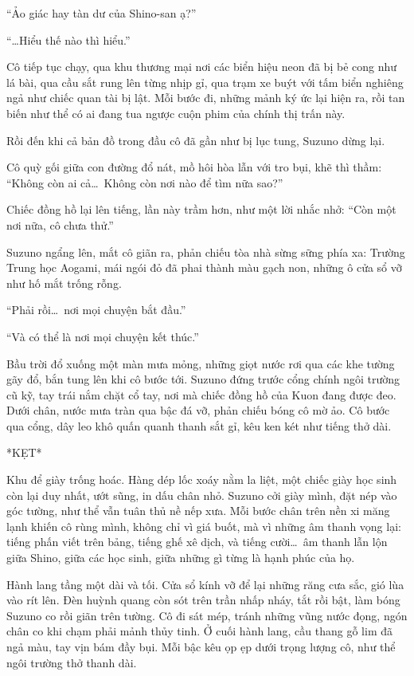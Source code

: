 \documentclass[../main.tex]{subfiles}
\begin{document}
``Ảo giác hay tàn dư của Shino-san ạ?''

``\dots Hiểu thế nào thì hiểu.''

Cô tiếp tục chạy, qua khu thương mại nơi các biển hiệu neon đã bị bẻ cong như lá bài, qua cầu sắt rung lên từng nhịp gỉ, qua trạm xe buýt với tấm biển nghiêng ngả như chiếc quan tài bị lật. Mỗi bước đi, những mảnh ký ức lại hiện ra, rồi tan biến như thể có ai đang tua ngược cuộn phim của chính thị trấn này.

Rồi đến khi cả bản đồ trong đầu cô đã gần như bị lục tung, Suzuno dừng lại.

Cô quỳ gối giữa con đường đổ nát, mồ hôi hòa lẫn với tro bụi, khẽ thì thầm: ``Không còn ai cả\dots\ Không còn nơi nào để tìm nữa sao?''

Chiếc đồng hồ lại lên tiếng, lần này trầm hơn, như một lời nhắc nhở: ``Còn một nơi nữa, cô chưa thử.''

Suzuno ngẩng lên, mắt cô giãn ra, phản chiếu tòa nhà sừng sững phía xa: Trường Trung học Aogami, mái ngói đỏ đã phai thành màu gạch non, những ô cửa sổ vỡ như hố mắt trống rỗng.

``Phải rồi\dots\ nơi mọi chuyện bắt đầu.''

``Và có thể là nơi mọi chuyện kết thúc.''

Bầu trời đổ xuống một màn mưa mỏng, những giọt nước rơi qua các khe tường gãy đổ, bắn tung lên khi cô bước tới. Suzuno đứng trước cổng chính ngôi trường cũ kỹ, tay trái nắm chặt cổ tay, nơi mà chiếc đồng hồ của Kuon đang được đeo. Dưới chân, nước mưa tràn qua bậc đá vỡ, phản chiếu bóng cô mờ ảo. Cô bước qua cổng, dây leo khô quấn quanh thanh sắt gỉ, kêu ken két như tiếng thở dài.

*KẸT*

Khu để giày trống hoác. Hàng dép lốc xoáy nằm la liệt, một chiếc giày học sinh còn lại duy nhất, ướt sũng, in dấu chân nhỏ. Suzuno cởi giày mình, đặt nép vào góc tường, như thể vẫn tuân thủ nề nếp xưa. Mỗi bước chân trên nền xi măng lạnh khiến cô rùng mình, không chỉ vì giá buốt, mà vì những âm thanh vọng lại: tiếng phấn viết trên bảng, tiếng ghế xê dịch, và tiếng cười\dots\ âm thanh lẫn lộn giữa Shino, giữa các học sinh, giữa những gì từng là hạnh phúc của họ.

Hành lang tầng một dài và tối. Cửa sổ kính vỡ để lại những răng cưa sắc, gió lùa vào rít lên. Đèn huỳnh quang còn sót trên trần nhấp nháy, tắt rồi bật, làm bóng Suzuno co rồi giãn trên tường. Cô đi sát mép, tránh những vũng nước đọng, ngón chân co khi chạm phải mảnh thủy tinh. Ở cuối hành lang, cầu thang gỗ lim đã ngả màu, tay vịn bám đầy bụi. Mỗi bậc kêu ọp ẹp dưới trọng lượng cô, như thể ngôi trường thở thanh dài.
\end{document}
